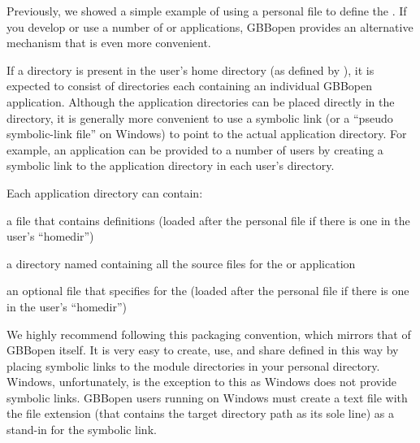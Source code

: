 \documentclass[10pt,twoside,english,pdftex]{article}
\begin{document}
\label{sec:personal-gbbopen-modules-directory}

%
%
%
%
%
%
Previously, we showed a simple example of using a personal
 file to define the 
.  If you develop or use a number of  or
applications, GBBopen provides an alternative mechanism that is even more
convenient.

If a  directory is present in the user's home
directory (as defined by ), it is expected to
consist of directories each containing an individual GBBopen application.
Although the application directories can be placed directly in the
 directory, it is generally more convenient to
use a symbolic link (or a ``pseudo symbolic-link file'' on Windows) to point
to the actual application directory.  For example, an application can be
provided to a number of users by creating a symbolic link to the application
directory in each user's  directory.

Each application directory can contain:
%
\begin{tightitemize}
\item a  file that contains  definitions
  (loaded after the personal  file if there is
  one in the user's ``homedir'')
\item a directory named  containing all the source files for the
   or application
\item an optional  file that specifies
   for the  (loaded after the personal
   file if there is one in the user's
  ``homedir'')
\end{tightitemize}

We highly recommend following this packaging convention, which mirrors that of
GBBopen itself. It is very easy to create, use, and share 
defined in this way by placing symbolic links to the module directories in
your personal  directory.  Windows, unfortunately, is
the exception to this as Windows does not provide symbolic links.  GBBopen
users running on Windows must create a text file with the file extension
 (that contains the target directory path as its sole line) as a
stand-in for the symbolic link.
\end{document}
